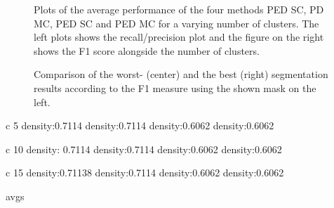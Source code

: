 \begin{figure}[H]
\begin{center}

\end{center}
\caption[Chair 3 Cast avg statistic plots]{Plots of the average performance of the four methods PED SC, PD MC, PED SC and PED MC for a varying number of clusters. The left plots shows the recall/precision plot and the figure on the right shows the F1 score alongside the number of clusters.}
\label{fig:chair_3_cast_plot_avg_stat}
\end{figure}

\begin{figure}[H]
\begin{center}
\end{center}
\caption[Chair 3 Cast Worst/Best Result]{Comparison of the worst- (center) and the best (right) segmentation results according to the F1 measure using the shown mask on the left.}
\label{fig:chair_3_cast_gt_worst_best}
\end{figure}


c 5
density:0.7114
density:0.7114
density:0.6062
density:0.6062

c 10
density: 0.7114
density:0.7114
density:0.6062
density:0.6062

c 15
density:0.71138
density:0.7114
density:0.6062
density:0.6062


avgs





